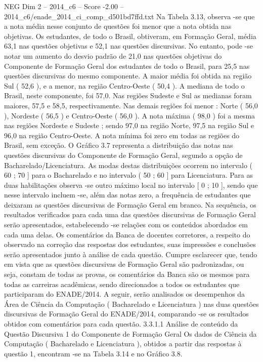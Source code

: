 \begin{textsample}{NEG Dim 2 – 2014\_c6 – Score -2.00 – 2014\_c6/enade\_2014\_ci\_comp\_d501bd7ffd.txt}
Na Tabela 3.13, observa -se que a nota média nesse conjunto de questões foi menor que a nota obtida nas objetivas.
Os estudantes, de todo o Brasil, obtiveram, em Formação Geral, média 63,1 nas questões objetivas e 52,1 nas questões discursivas.
No entanto, pode -se notar um aumento do desvio padrão de 21,0 nas questões objetivas do Componente de Formação Geral dos estudantes de todo o Brasil, para 25,5 nas questões discursivas do mesmo componente.
A maior média foi obtida na região Sul ( 52,6 ), e a menor, na região Centro-Oeste ( 50,4 ).
A mediana de todo o Brasil, neste componente, foi 57,0.
Nas regiões Sudeste e Sul as medianas foram maiores, 57,5 e 58,5, respectivamente.
Nas demais regiões foi menor : Norte ( 56,0 ), Nordeste ( 56,5 ) e Centro-Oeste ( 56,0 ).
A nota máxima ( 98,0 ) foi a mesma nas regiões Nordeste e Sudeste ; sendo 97,0 na região Norte, 97,5 na região Sul e 96,0 na região Centro-Oeste.
A nota mínima foi zero em todas as regiões do Brasil, sem exceção.
O Gráfico 3.7 representa a distribuição das notas nas questões discursivas do Componente de Formação Geral, segundo a opção de Bacharelado/Licenciatura.
As modas destas distribuições ocorrem no intervalo ( 60 ; 70 ] para o Bacharelado e no intervalo ( 50 ; 60 ] para Licenciatura.
Para as duas habilitações observa -se outro máximo local no intervalo [ 0 ; 10 ], sendo que nesse intervalo incluem -se, além das notas zero, a frequência de estudantes que deixaram as questões discursivas de Formação Geral em branco.
Na sequência, os resultados verificados para cada uma das questões discursivas de Formação Geral serão apresentados, estabelecendo -se relações com os conteúdos abordados em cada uma delas.
Os comentários da Banca de docentes corretores, a respeito do observado na correção das respostas dos estudantes, suas impressões e conclusões serão apresentados junto à análise de cada questão.
Cumpre esclarecer que, tendo em vista que as questões discursivas de Formação Geral são padronizadas, ou seja, constam de todas as provas, os comentários da Banca são os mesmos para todas as carreiras acadêmicas, sendo direcionados a todos os estudantes que participaram do ENADE/2014.
A seguir, serão analisados os desempenhos da Área de Ciência da Computação ( Bacharelado e Licenciatura ) nas duas questões discursivas de Formação Geral do ENADE/2014, comparando -se os resultados obtidos com comentários para cada questão. 3.3.1.1 Análise de conteúdo da Questão Discursiva 1 do Componente de Formação Geral Os dados de Ciência da Computação ( Bacharelado e Licenciatura ), obtidos a partir das respostas à questão 1, encontram -se na Tabela 3.14 e no Gráfico 3.8.

\end{textsample}
